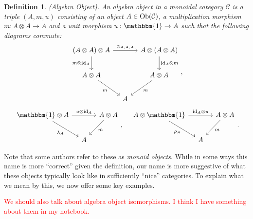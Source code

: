 \documentclass[12pt, reqno]{amsart}
\numberwithin{equation}{section}
\theoremstyle{plainspace}
\theoremstyle{definitionspace}
\newtheorem{definition}[theorem]{Definition}
\theoremstyle{remarkspace}
\newcommand{\id}{\textup{id}}
\newcommand{\mathcat}[1]{\mathcal{#1}}
\newcommand{\Ob}{\textup{Ob}}
\begin{document}
\begin{definition}\label{def:algebra_object}{\em (Algebra Object).} \cite[Definition 8(i)]{Ostrik_2003}
An algebra object in a monoidal category $\mathcat{C}$ is a triple $(A, m, u)$ consisting of an object $A \in \Ob(\mathcat{C})$, a multiplication morphism $m : A \otimes A \to A$ and a unit morphism $u : \mathbbm{1} \to A$ such that the following diagrams commute:
\begin{equation}
\begin{tikzcd}[column sep = 1.0em, row sep = 2.0em]
{(A \otimes A) \otimes A} \arrow[d, "{m \otimes \id_A}"'] \arrow[rr, "{\alpha_{A,A,A}}"] & & {A \otimes (A \otimes A)} \arrow[d, "{\id_A \otimes m}"] \\
{A \otimes A} \arrow[dr, "{m}"'] & & {A \otimes A} \arrow[dl, "{m}"] \\
& A
\end{tikzcd},
\label{eq:algebra_object_pentagon}
\end{equation}
\begin{equation}
\begin{tikzcd}[column sep = 1.0em, row sep = 2.0em]
{\mathbbm{1} \otimes A} \arrow[dr, "{\lambda_A}"'] \arrow[rr, "{u \otimes \id_A}"] & & {A \otimes A} \arrow[dl, "{m}"] \\
& A
\end{tikzcd},
\quad
\begin{tikzcd}[column sep = 1.0em, row sep = 2.0em]
{A \otimes \mathbbm{1}} \arrow[dr, "{\rho_A}"'] \arrow[rr, "{\id_A \otimes u}"] & & {A \otimes A} \arrow[dl, "{m}"] \\
& A
\end{tikzcd}.
\label{eq:algebra_object_triangles}
\end{equation}
\end{definition}
\leavevmode

\noindent Note that some authors refer to these as {\em monoid objects}. While in some ways this name is more ``correct'' given the definition, our name is more suggestive of what these objects typically look like in sufficiently ``nice'' categories. To explain what we mean by this, we now offer some key examples.
\newline

\noindent \textcolor{red}{We should also talk about algebra object isomorphisms. I think I have something about them in my notebook.}
\newline
\end{document}

